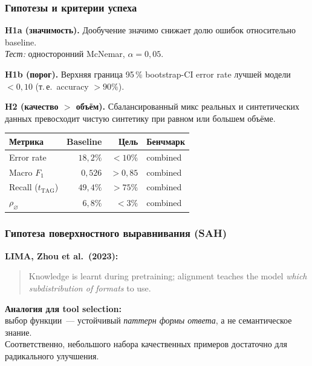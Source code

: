 \documentclass[aspectratio=169]{beamer}
\begin{document}
\begin{frame}
\frametitle{Гипотезы и критерии успеха}
\textbf{H1a (значимость).} Дообучение значимо снижает долю ошибок относительно baseline.\\
\hphantom{aaaa}\emph{Тест:} односторонний McNemar, $\alpha = 0{,}05$.

\smallskip
\textbf{H1b (порог).} Верхняя граница 95\,\% bootstrap-CI error rate лучшей модели $< 0{,}10$ (т.\,е.\ accuracy $> 90\%$).

\smallskip
\textbf{H2 (качество $>$ объём).} Сбалансированный микс реальных и синтетических данных превосходит чистую синтетику при равном или большем объёме.

\bigskip
\begin{center}
\begin{tabular}{lrrl}
\toprule
\textbf{Метрика} & \textbf{Baseline} & \textbf{Цель} & \textbf{Бенчмарк} \\
\midrule
Error rate               & $18{,}2\%$ & $< 10\%$  & combined \\
Macro $F_1$              & $0{,}526$  & $> 0{,}85$ & combined \\
Recall ($t_{\mathrm{TAG}}$) & $49{,}4\%$ & $> 75\%$ & combined \\
$\rho_\varnothing$       & $6{,}8\%$  & $< 3\%$    & combined \\
\bottomrule
\end{tabular}
\end{center}
\end{frame}

\begin{frame}
\frametitle{Гипотеза поверхностного выравнивания (SAH)}
\textbf{LIMA, Zhou et al.\ (2023):}
\begin{quote}
Knowledge is learnt during pretraining; alignment teaches the model \emph{which subdistribution of formats} to use.
\end{quote}

\textbf{Аналогия для tool selection:}\\
выбор функции~— устойчивый \emph{паттерн формы ответа}, а не семантическое знание.\\
Соответственно, небольшого набора качественных примеров достаточно для радикального улучшения.
\end{frame}
\end{document}
